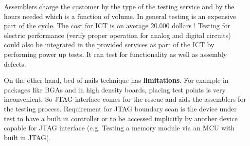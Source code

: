 \documentclass[final]{cubedoc}
\begin{document}
	Assemblers charge the customer by the type of the testing service and by the hours needed which is a function of volume. In general testing is an expensive part of the cycle.
	The cost for ICT is on average 20.000 dollars \cite{wiki:flying}! 
	Testing for electric performance (verify proper operation for analog and digital circuits) could also be integrated in the provided services as part of the ICT by performing power up tests. It can test for functionality as well as assembly defects.
	
	On the other hand, bed of nails technique has \textbf{limitations}. For example in packages like BGAs and in high density boards, placing test points is very inconvenient. So JTAG interface comes for the rescue and aids the assemblers for the testing process. Requirement for JTAG boundary scan is the device under test to have a built in controller or to be accessed implicitly by another device capable for JTAG interface (e.g. Testing a memory module via an MCU with built in JTAG).
	
	
	
	
	
\end{document}
